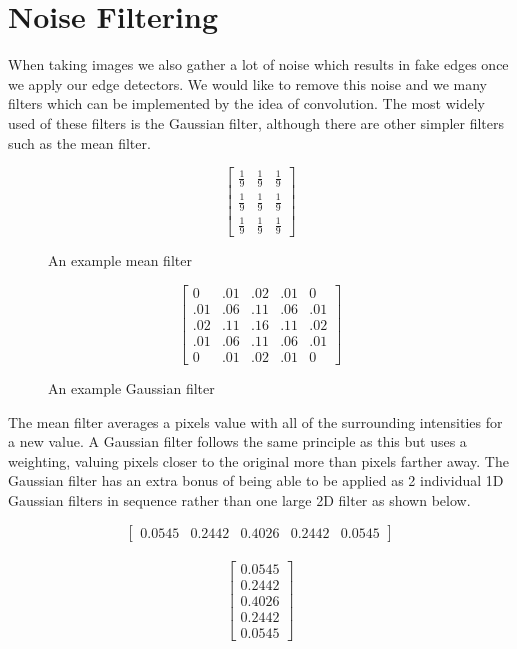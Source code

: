 \documentclass{article}
\begin{document}
	\section{Noise Filtering}
	When taking images we also gather a lot of noise which results in fake edges once we apply our edge detectors. We would like to remove this noise and we many filters which can be implemented by the idea of convolution. The most widely used of these filters is the Gaussian filter, although there are other simpler filters such as the mean filter.
	\begin{figure}[ht]
	\begin{minipage}{.5\textwidth}
			\begingroup
			\renewcommand*{\arraystretch}{1.7}	
			\centering
			\[ \begin{bmatrix} \frac{1}{9} & \frac{1}{9} & \frac{1}{9} \\
								\frac{1}{9} & \frac{1}{9} & \frac{1}{9} \\
								\frac{1}{9} & \frac{1}{9} & \frac{1}{9}
			\end{bmatrix} \]
			\endgroup
			\caption{An example mean filter}
			\label{fig:mean filter}
	\end{minipage}
	\begin{minipage}{.5\textwidth}
		\centering
		\[ \begin{bmatrix} 0 & .01 & .02 & .01 & 0 \\
								.01 & .06 & .11 & .06 & .01 \\ 
							    .02 & .11 & .16 & .11 & .02 \\
							    .01 & .06 & .11 & .06 & .01 \\
							    0 & .01 & .02 & .01 & 0
				\end{bmatrix} \]
		\caption{An example Gaussian filter}
		\label{fig:gaussian filter}

	\end{minipage}
	\end{figure}
	
	The mean filter averages a pixels value with all of the surrounding intensities for a new value. A Gaussian filter follows the same principle as this but uses a weighting, valuing pixels closer to the original more than pixels farther away.	The Gaussian filter has an extra bonus of being able to be applied as 2 individual 1D Gaussian filters in sequence rather than one large 2D filter as shown below.
	
	\begin{multicols}{2}
		\[\begin{bmatrix} 0.0545 & 0.2442 & 0.4026 & 0.2442 & 0.0545 \end{bmatrix} \] \\
		\[\begin{bmatrix} 0.0545 \\ 0.2442 \\ 0.4026 \\ 0.2442 \\ 0.0545 \end{bmatrix} \]
	\end{multicols}
	
\end{document}

